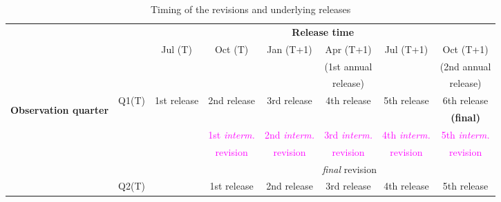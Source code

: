 \begin{table}[H]
\centering{}\caption{Timing of the revisions and underlying releases \label{chron}}
\noindent\begin{minipage}[t]{1\columnwidth}%
\begin{center}
\begin{tabular}{|c|c|c|c|c|c|c|c|}
\hline 
\multicolumn{1}{|c}{\multirow{2}{*}{}} & \multirow{2}{*}{} & \multicolumn{6}{c|}{\textbf{\small{}Release time}}\tabularnewline
\cline{3-8} \cline{4-8} \cline{5-8} \cline{6-8} \cline{7-8} \cline{8-8} 
 &  & \multirow{3}{*}{{\small{}Jul (T)}} & \multirow{3}{*}{{\small{}Oct (T)}} & \multirow{3}{*}{{\small{}Jan (T+1)}} & {\small{}Apr (T+1)} & \multirow{3}{*}{{\small{}Jul (T+1)}} & {\small{}Oct (T+1)}\tabularnewline
\multicolumn{1}{|c}{} &  &  &  &  & {\small{}(1st annual } &  & {\small{}(2nd annual }\tabularnewline
\multicolumn{1}{|c}{} &  &  &  &  & {\small{}release)} &  & {\small{}release)}\tabularnewline
\hline 
\multirow{20}{*}{\begin{turn}{90}
\textbf{\small{}Observation quarter}
\end{turn}} & \multirow{5}{*}{{\small{}Q1(T)}} & \multirow{2}{*}{{\small{}1st release}} & \multirow{2}{*}{{\small{}2nd release}} & \multirow{2}{*}{{\small{}3rd release}} & \multirow{2}{*}{{\small{}4th release}} & \multirow{2}{*}{{\small{}5th release}} & {\small{}6th release }\tabularnewline
 &  &  &  &  &  &  & \textbf{\small{}(final)}\tabularnewline
\cline{3-8} \cline{4-8} \cline{5-8} \cline{6-8} \cline{7-8} \cline{8-8} 
 &  & \multirow{3}{*}{} & \textcolor{magenta}{\small{}1st }\textcolor{magenta}{\emph{\small{}interm.}} & \textcolor{magenta}{\small{}2nd }\textcolor{magenta}{\emph{\small{}interm.}} & \textcolor{magenta}{\small{}3rd }\textcolor{magenta}{\emph{\small{}interm.}} & \textcolor{magenta}{\small{}4th }\textcolor{magenta}{\emph{\small{}interm.}} & \textcolor{magenta}{\small{}5th }\textcolor{magenta}{\emph{\small{}interm.}}\tabularnewline
 &  &  & \textcolor{magenta}{\small{}revision} & \textcolor{magenta}{\small{}revision} & \textcolor{magenta}{\small{}revision} & \textcolor{magenta}{\small{}revision} & \textcolor{magenta}{\small{}revision}\tabularnewline
\cline{4-8} \cline{5-8} \cline{6-8} \cline{7-8} \cline{8-8} 
 &  &  & \multicolumn{5}{c|}{\emph{final} revision}\tabularnewline
\cline{2-8} \cline{3-8} \cline{4-8} \cline{5-8} \cline{6-8} \cline{7-8} \cline{8-8} 
 & \multirow{5}{*}{{\small{}Q2(T)}} & \multirow{5}{*}{} & \multirow{2}{*}{{\small{}1st release}} & \multirow{2}{*}{{\small{}2nd release}} & \multirow{2}{*}{{\small{}3rd release}} & \multirow{2}{*}{{\small{}4th release}} & {\small{}5th release }\tabularnewline

\end{tabular}
\end{center}
\end{minipage}
\end{table}
